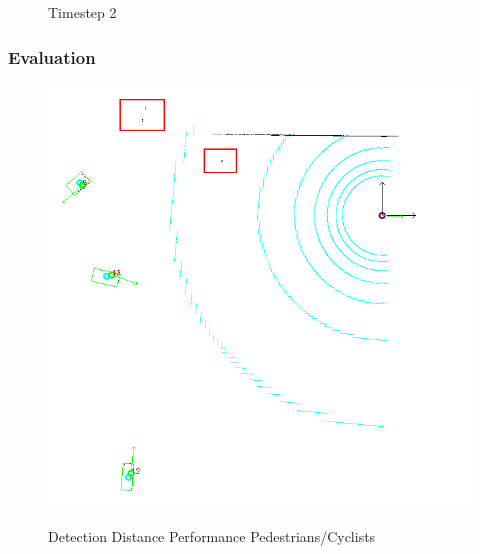 \documentclass[nosymbols]{beamer}	%
\begin{document}
\begin{frame}
\begin{figure}[!ht]
\begin{center}
\begin{minipage}[t]{0.49\textwidth}
        Timestep 2
    \end{minipage}
    \label{detection_performance}
\label{obst_cases}
\end{center}
\end{figure}
\end{frame}


\begin{frame}
\frametitle{Evaluation}
\begin{figure}[!ht]
\begin{center}
\caption{Detection Distance Performance Pedestrians/Cyclists}
\includegraphics[width=\textwidth,height=0.7\textheight,keepaspectratio]{bilder/alg/img100002_m_s.png}
\label{obst_cases}
\end{center}
\end{figure}
\end{frame}
\end{document}

